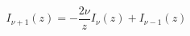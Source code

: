 \documentclass[12pt]{article}
\begin{document}
\begin{displaymath}
I_{\nu+1}(z) = -\frac{2\nu}{z}I_\nu(z) + I_{\nu-1}(z)
\end{displaymath}
\end{document}

